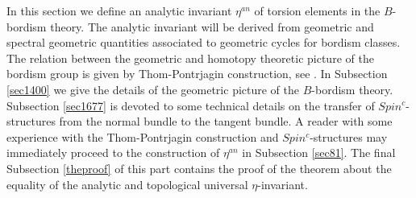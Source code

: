 \documentclass[12pt]{article}
\newcommand{\cB}{{\mathcal{B}}}
\newcommand{\nat}{{\mathbb{N}}}
\newcommand{\R}{{\mathbb{R}}}
\newcommand{\colim}{{\tt colim}}
\begin{document}
In this section we define an analytic invariant  $\eta^{an}$ of torsion elements in the $B$-bordism theory. The analytic invariant will be derived from geometric and spectral geometric quantities
associated to geometric cycles  for bordism classes. The relation between the 
geometric  and homotopy theoretic picture of the bordism group is given by  Thom-Pontrjagin construction, see \cite[Ch IV.7]{MR1627486}.  
In Subsection \ref{sec1400} we give the details of the geometric picture of the $B$-bordism theory.
Subsection \ref{sec1677} is devoted to some technical details on the transfer of $Spin^{c}$-structures from the normal bundle to the tangent bundle.
A reader with some experience with the Thom-Pontrjagin construction and $Spin^{c}$-structures may immediately proceed to the construction of $\eta^{an}$ in Subsection \ref{sec81}. The final Subsection \ref{theproof} of this part contains the proof of the theorem about the equality of the analytic and topological universal $\eta$-invariant.




\end{document}

